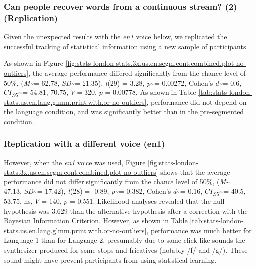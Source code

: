 \documentclass[
]{article}
\newcommand{\T}{{\em t\/}}
\newcommand{\p}{{\em p\/}}
\newcommand{\M}{{\em M\/}}
\newcommand{\SD}{{\em SD\/}}
\newcommand{\D}{Cohen's {\em d\/}}
\newcommand{\CI}{$CI_{.95}$}
\begin{document}
\hypertarget{can-people-recover-words-from-a-continuous-stream-2-replication-1}{%
\subsubsection{Can people recover words from a continuous stream? (2)
(Replication)}\label{can-people-recover-words-from-a-continuous-stream-2-replication-1}}

Given the unexpected results with the \emph{en1} voice below, we
replicated the successful tracking of statistical information using a
new sample of participants.

As shown in Figure
\ref{fig:stats-london-stats.3x.us.en.segm.cont.combined.plot-no-outliers},
the average performance differed significantly from the chance level of
50\%, (\M\textasciitilde= 62.78, \SD\textasciitilde= 21.35), \T(29) =
3.28, \p\textasciitilde= 0.00272, \D\textasciitilde= 0.6,
\CI\textasciitilde= 54.81, 70.75, \(V\) = 320, \(p\) = 0.00778. As shown
in Table
\ref{tab:stats-london-stats.us.en.lang.glmm.print.with.or-no-outliers},
performance did not depend on the language condition, and was
significantly better than in the pre-segmented condition.

\hypertarget{replication-with-a-different-voice-en1}{%
\subsubsection{Replication with a different voice
(en1)}\label{replication-with-a-different-voice-en1}}

However, when the \emph{en1} voice was used, Figure
\ref{fig:stats-london-stats.3x.us.en.segm.cont.combined.plot-no-outliers}
shows that the average performance did not differ significantly from the
chance level of 50\%, (\M\textasciitilde= 47.13, \SD\textasciitilde=
17.42), \T(28) = -0.89, \p\textasciitilde= 0.382, \D\textasciitilde=
0.16, \CI\textasciitilde= 40.5, 53.75, ns, \(V\) = 140, \(p\) = 0.551.
Likelihood analyses revealed that the null hypothesis was 3.629 than the
alternative hypothesis after a correction with the Bayesian Information
Criterion. However, as shown in Table
\ref{tab:stats-london-stats.us.en.lang.glmm.print.with.or-no-outliers},
performance was much better for Language 1 than for Language 2,
presumably due to some click-like sounds the synthesizer produced for
some stops and fricatives (notably /f/ and /g/). These sound might have
prevent participants from using statistical learning.
\end{document}
